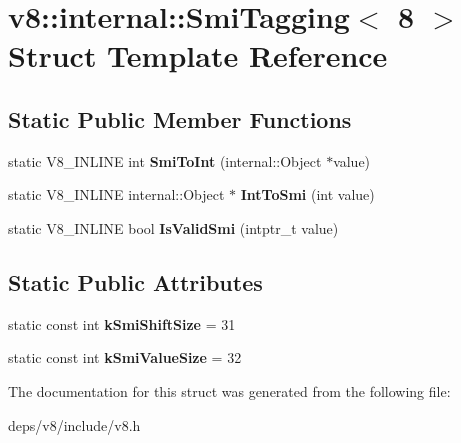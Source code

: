 \hypertarget{structv8_1_1internal_1_1_smi_tagging_3_018_01_4}{}\section{v8\+:\+:internal\+:\+:Smi\+Tagging$<$ 8 $>$ Struct Template Reference}
\label{structv8_1_1internal_1_1_smi_tagging_3_018_01_4}
\subsection*{Static Public Member Functions}
\begin{DoxyCompactItemize}
\item 
\hypertarget{structv8_1_1internal_1_1_smi_tagging_3_018_01_4_aa1573b36c3b6af28c449b2ca993ffb81}{}static V8\+\_\+\+I\+N\+L\+I\+N\+E int {\bfseries Smi\+To\+Int} (internal\+::\+Object $\ast$value)\label{structv8_1_1internal_1_1_smi_tagging_3_018_01_4_aa1573b36c3b6af28c449b2ca993ffb81}

\item 
\hypertarget{structv8_1_1internal_1_1_smi_tagging_3_018_01_4_a1926f38e35fc98fe244e8136180d70f2}{}static V8\+\_\+\+I\+N\+L\+I\+N\+E internal\+::\+Object $\ast$ {\bfseries Int\+To\+Smi} (int value)\label{structv8_1_1internal_1_1_smi_tagging_3_018_01_4_a1926f38e35fc98fe244e8136180d70f2}

\item 
\hypertarget{structv8_1_1internal_1_1_smi_tagging_3_018_01_4_a5ab93d4cf7c3b9ceff5116b3598a1f94}{}static V8\+\_\+\+I\+N\+L\+I\+N\+E bool {\bfseries Is\+Valid\+Smi} (intptr\+\_\+t value)\label{structv8_1_1internal_1_1_smi_tagging_3_018_01_4_a5ab93d4cf7c3b9ceff5116b3598a1f94}

\end{DoxyCompactItemize}
\subsection*{Static Public Attributes}
\begin{DoxyCompactItemize}
\item 
\hypertarget{structv8_1_1internal_1_1_smi_tagging_3_018_01_4_a9a3b3da7b6d82417b961c8bed4366407}{}static const int {\bfseries k\+Smi\+Shift\+Size} = 31\label{structv8_1_1internal_1_1_smi_tagging_3_018_01_4_a9a3b3da7b6d82417b961c8bed4366407}

\item 
\hypertarget{structv8_1_1internal_1_1_smi_tagging_3_018_01_4_a08ad86fa77f6faee6ec744abdb0f6dce}{}static const int {\bfseries k\+Smi\+Value\+Size} = 32\label{structv8_1_1internal_1_1_smi_tagging_3_018_01_4_a08ad86fa77f6faee6ec744abdb0f6dce}

\end{DoxyCompactItemize}


The documentation for this struct was generated from the following file\+:\begin{DoxyCompactItemize}
\item 
deps/v8/include/v8.\+h\end{DoxyCompactItemize}
